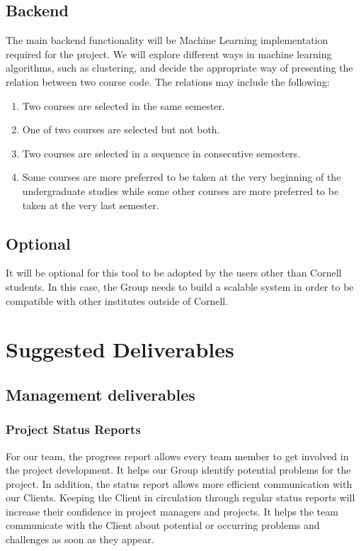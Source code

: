 \documentclass{article}
\begin{document}
\subsection{Backend}
The main backend functionality will be Machine Learning implementation required for the project. We will explore different ways in machine learning algorithms, such as clustering, and decide the appropriate way of presenting the relation between two course code. The relations may include the following:
\begin{enumerate}
    \item Two courses are selected in the same semester.
    \item One of two courses are selected but not both.
    \item Two courses are selected in a sequence in consecutive semesters.
    \item Some courses are more preferred to be taken at the very beginning of the undergraduate studies while some other courses are more preferred to be taken at the very last semester.
\end{enumerate}
\subsection{Optional}
It will be optional for this tool to be adopted by the users other than Cornell students. In this case, the Group needs to build a scalable system in order to be compatible with other institutes outside of Cornell.

\section{Suggested Deliverables}
\subsection{Management deliverables}
\subsubsection{Project Status Reports}
For our team, the progress report allows every team member to get involved in the project development. It helps our Group identify potential problems for the project. In addition, the status report allows more efficient communication with our Clients. Keeping the Client in circulation through regular status reports will increase their confidence in project managers and projects. It helps the team communicate with the Client about potential or occurring problems and challenges as soon as they appear.
\end{document}
